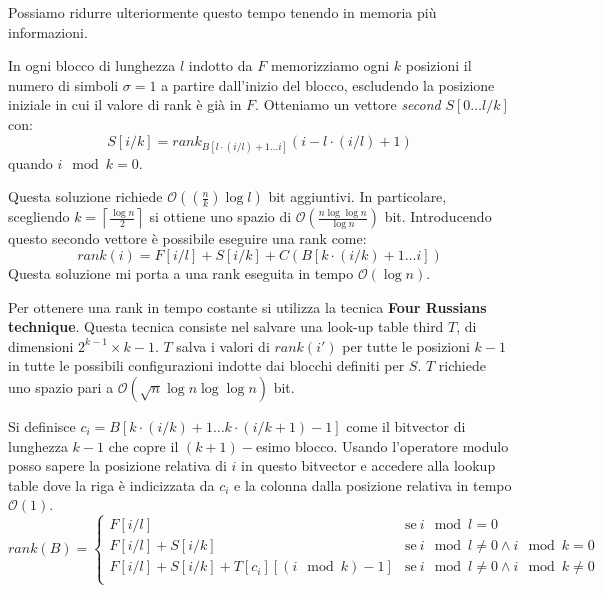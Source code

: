 Possiamo ridurre ulteriormente questo tempo tenendo in memoria più informazioni.

In ogni blocco di lunghezza $l$ indotto da $F$ memorizziamo ogni $k$ posizioni il
numero di simboli $\sigma = 1$ a partire dall'inizio del blocco, escludendo la
posizione iniziale in cui il valore di rank è già in $F$. Otteniamo un vettore
\textit{second} $S[0 \dots l /k]$ con:
\begin{equation}
    S[i/k] = rank_{B[l \cdot (i / l) + 1 \dots i]} (i - l \cdot (i / l) + 1)
\end{equation} quando $i \mod k = 0$.

Questa soluzione richiede $\mathcal{O}((\frac{n}{k}) \log l)$ bit aggiuntivi.
In particolare, scegliendo $k = \left\lceil \frac{\log n}{2} \right\rceil$ si
ottiene uno spazio di $\mathcal{O}(\frac{n \log \log n}{\log n})$ bit. Introducendo
questo secondo vettore è possibile eseguire una rank come:
\begin{equation}
    rank(i) = F[i/l] + S[i /k] + C(B[k \cdot (i / k) + 1 \dots i])
\end{equation}
Questa soluzione mi porta a una rank eseguita in tempo $\mathcal{O}(\log n )$.

Per ottenere una rank in tempo costante si utilizza la tecnica \textbf{Four Russians technique}.
Questa tecnica consiste nel salvare una look-up table third $T$, di dimensioni
$2^{k - 1} \times k - 1$. $T$ salva i valori di $rank(i')$ per tutte le posizioni
$k - 1$ in tutte le possibili configurazioni indotte dai blocchi definiti per $S$. $T$
richiede uno spazio pari a $\mathcal{O}(\sqrt{n} \log n \log \log n)$ bit.

Si definisce $c_i = B[k \cdot (i / k) + 1 \dots k \cdot (i / k + 1) - 1]$ come
il bitvector di lunghezza $k - 1$ che copre il $(k + 1)-$esimo blocco. Usando
l'operatore modulo posso sapere la posizione relativa di $i$ in questo bitvector
e accedere alla lookup table dove la riga è indicizzata da $c_i$ e la colonna dalla
posizione relativa in tempo $\mathcal{O}(1)$.
\begin{equation}
    rank(B) = \begin{cases}
        F[i/l]                                   & \text{se} \ i \mod l = 0                          \\
        F[i/l] + S[i/k]                          & \text{se} \ i \mod l \neq 0 \land i \mod k = 0    \\
        F[i/l] + S[i/k] + T[c_i][(i \mod k) - 1] & \text{se} \ i \mod l \neq 0 \land i \mod k \neq 0 \\
    \end{cases}
\end{equation}

